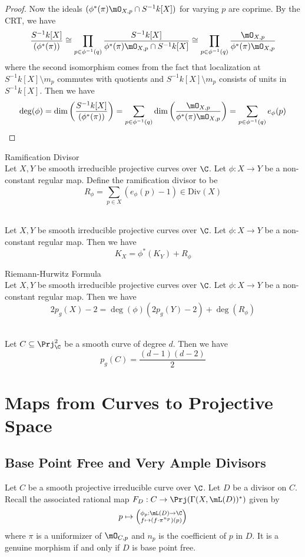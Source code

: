 \documentclass[a4paper]{article}
\begin{document}
\begin{prp}{}{}
\begin{proof}
Now the ideals $(\phi^\ast(\pi)\mO_{X,p}\cap S^{-1}k[X])$ for varying $p$ are coprime. By the CRT, we have $$\frac{S^{-1}k[X]}{(\phi^\ast(\pi))}\cong\prod_{p\in\phi^{-1}(q)}\frac{S^{-1}k[X]}{\phi^\ast(\pi)\mO_{X,p}\cap S^{-1}k[X]}\cong\prod_{p\in\phi^{-1}(q)}\frac{\mO_{X,p}}{\phi^\ast(\pi)\mO_{X,p}}$$ where the second isomorphism comes from the fact that localization at $S^{-1}k[X]\setminus m_p$ commutes with quotients and $S^{-1}k[X]\setminus m_p$ consists of units in $S^{-1}k[X]$. Then we have $$\deg(\phi)=\dim\left(\frac{S^{-1}k[X]}{(\phi^\ast(\pi))}\right)=\sum_{p\in\phi^{-1}(q)}\dim\left(\frac{\mO_{X,p}}{\phi^\ast(\pi)\mO_{X,p}}\right)=\sum_{p\in\phi^{-1}(q)}e_\phi(p)$$
\end{proof}
\end{prp}

\begin{defn}{Ramification Divisor}{}\\
Let $X,Y$ be smooth irreducible projective curves over $\C$. Let $\phi:X\to Y$ be a non-constant regular map. Define the ramification divisor to be $$R_\phi=\sum_{p\in X}(e_\phi(p)-1)\in\text{Div}(X)$$
\end{defn}

\begin{prp}{}{}\\
Let $X,Y$ be smooth irreducible projective curves over $\C$. Let $\phi:X\to Y$ be a non-constant regular map. Then we have $$K_X=\phi^\ast(K_Y)+R_\phi$$
\end{prp}

\begin{thm}{Riemann-Hurwitz Formula}{}\\
Let $X,Y$ be smooth irreducible projective curves over $\C$. Let $\phi:X\to Y$ be a non-constant regular map. Then we have $$2p_g(X)-2=\deg(\phi)(2p_g(Y)-2)+\deg(R_\phi)$$
\end{thm}

\begin{prp}{}{}\\
Let $C\subseteq\Prj_\C^2$ be a smooth curve of degree $d$. Then we have $$p_g(C)=\frac{(d-1)(d-2)}{2}$$
\end{prp}

\pagebreak
\section{Maps from Curves to Projective Space}
\subsection{Base Point Free and Very Ample Divisors}
Let $C$ be a smooth projective irreducible curve over $\C$. Let $D$ be a divisor on $C$. Recall the associated rational map $F_D:C\to\Prj(\Gamma(X,\mL(D))^\ast)$ given by $$p\mapsto\left(\substack{\phi_p:\mL(D)\to\C\\f\mapsto(f\cdot\pi^{n_p})(p)}\right)$$ where $\pi$ is a uniformizer of $\mO_{C,p}$ and $n_p$ is the coefficient of $p$ in $D$. It is a genuine morphism if and only if $D$ is base point free. 
\end{document}
